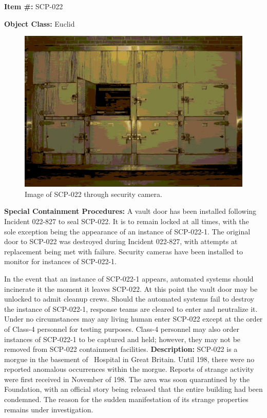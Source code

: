 
\textbf{Item \#:} SCP-022

\textbf{Object Class:} Euclid

\begin{figure}[h]
\begin{center}
\includegraphics[scale=0.4]{scp/022.jpg}
\linebreak Image of SCP-022 through security camera.
\end{center}
\end{figure}

\textbf{Special Containment Procedures:} A vault door has been installed following Incident 022-827 to seal SCP-022. It is to remain locked at all times, with the sole exception being the appearance of an instance of SCP-022-1. The original door to SCP-022 was destroyed during Incident 022-827, with attempts at replacement being met with failure. Security cameras have been installed to monitor for instances of SCP-022-1.

In the event that an instance of SCP-022-1 appears, automated systems should incinerate it the moment it leaves SCP-022. At this point the vault door may be unlocked to admit cleanup crews. Should the automated systems fail to destroy the instance of SCP-022-1, response teams are cleared to enter and neutralize it. Under no circumstances may any living human enter SCP-022 except at the order of Class-4 personnel for testing purposes. Class-4 personnel may also order instances of SCP-022-1 to be captured and held; however, they may not be removed from SCP-022 containment facilities.
\newpage
\textbf{Description:} SCP-022 is a morgue in the basement of \redacted \ Hospital in Great Britain. Until 198, there were no reported anomalous occurrences within the morgue. Reports of strange activity were first received in November of 198. The area was soon quarantined by the Foundation, with an official story being released that the entire building had been condemned. The reason for the sudden manifestation of its strange properties remains under investigation.

